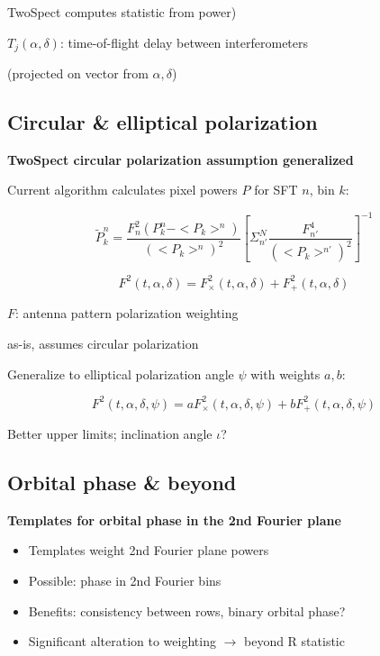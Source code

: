TwoSpect computes statistic from power)


$T_{j}(\alpha,\delta)$: time-of-flight delay between interferometers 


(projected on vector from $\alpha,\delta$)


\subsection{Circular \& elliptical polarization}


\textbf{TwoSpect circular polarization assumption generalized}


Current algorithm calculates pixel powers $P$ for SFT $n$, bin $k$:


\[
\tilde{P}_{k}^{n}=\frac{F_{n}^{2}(P_{k}^{n}-<P_{k}>^{n})}{(<P_{k}>^{n})^{2}}\left[\Sigma_{n'}^{N}\frac{F_{n'}^{4}}{(<P_{k}>^{n'})^{2}}\right]^{-1}
\]



\[
F^{2}(t,\alpha,\delta)=F_{\times}^{2}(t,\alpha,\delta)+F_{+}^{2}(t,\alpha,\delta)
\]



$F$: antenna pattern polarization weighting 


as-is, assumes circular polarization


Generalize to elliptical polarization angle $\psi$ with weights $a,b$:


\[
F^{2}(t,\alpha,\delta,\psi)=aF_{\times}^{2}(t,\alpha,\delta,\psi)+bF_{+}^{2}(t,\alpha,\delta,\psi)
\]



Better upper limits; inclination angle $\iota$?


\subsection{Orbital phase \& beyond}


\textbf{Templates for orbital phase in the 2nd Fourier plane}
\begin{itemize}
\item Templates weight 2nd Fourier plane powers
\item Possible: phase in 2nd Fourier bins
\item Benefits: consistency between rows, binary orbital phase?
\item Significant alteration to weighting $\rightarrow$ beyond R statistic
\end{itemize}

